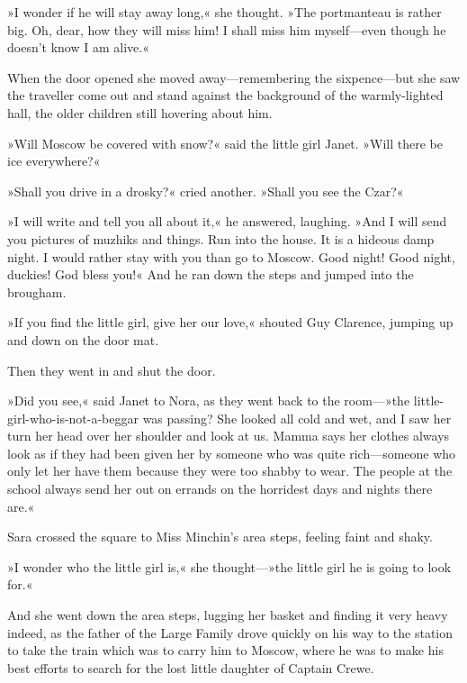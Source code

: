 »I wonder if he will stay away long,« she thought. »The portmanteau is rather big. Oh, dear, how they will miss him! I shall miss him myself—even though he doesn't know I am alive.«

When the door opened she moved away—remembering the sixpence—but she saw the traveller come out and stand against the background of the warmly-lighted hall, the older children still hovering about him.

»Will Moscow be covered with snow?« said the little girl Janet. »Will there be ice everywhere?«

»Shall you drive in a drosky?« cried another. »Shall you see the Czar?«

»I will write and tell you all about it,« he answered, laughing. »And I will send you pictures of muzhiks and things. Run into the house. It is a hideous damp night. I would rather stay with you than go to Moscow. Good night! Good night, duckies! God bless you!« And he ran down the steps and jumped into the brougham.

»If you find the little girl, give her our love,« shouted Guy Clarence, jumping up and down on the door mat.

Then they went in and shut the door.

»Did you see,« said Janet to Nora, as they went back to the room—»the little-girl-who-is-not-a-beggar was passing? She looked all cold and wet, and I saw her turn her head over her shoulder and look at us. Mamma says her clothes always look as if they had been given her by someone who was quite rich—someone who only let her have them because they were too shabby to wear. The people at the school always send her out on errands on the horridest days and nights there are.«

Sara crossed the square to Miss Minchin's area steps, feeling faint and shaky.

»I wonder who the little girl is,« she thought—»the little girl he is going to look for.«

And she went down the area steps, lugging her basket and finding it very heavy indeed, as the father of the Large Family drove quickly on his way to the station to take the train which was to carry him to Moscow, where he was to make his best efforts to search for the lost little daughter of Captain Crewe.